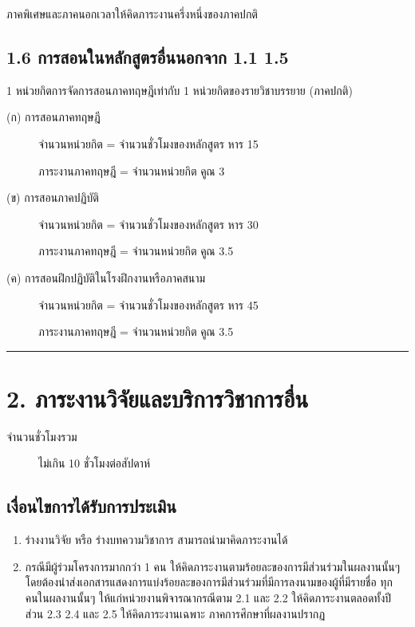 \documentclass[a4paper,12pt,english]{sphinxmanual}
\begin{document}
ภาคพิเศษและภาคนอกเวลาให้คิดภาระงานครึ่งหนึ่งของภาคปกติ


\subsection{1.6 การสอนในหลักสูตรอื่นนอกจาก 1.1 \sphinxhyphen{} 1.5}
\label{\detokenize{workload_rubric:id21}}
1 หน่วยกิตการจัดการสอนภาคทฤษฎีเท่ากับ 1 หน่วยกิตของรายวิชาบรรยาย (ภาคปกติ)
\begin{description}
\item[{(ก) การสอนภาคทฤษฎี}] \leavevmode
จำนวนหน่วยกิต = จำนวนชั่วโมงของหลักสูตร หาร 15

ภาระงานภาคทฤษฎี = จำนวนหน่วยกิต คูณ 3

\item[{(ข) การสอนภาคปฏิบัติ}] \leavevmode
จำนวนหน่วยกิต = จำนวนชั่วโมงของหลักสูตร หาร 30

ภาระงานภาคทฤษฎี = จำนวนหน่วยกิต คูณ 3.5

\item[{(ค) การสอนฝึกปฏิบัติในโรงฝึกงานหรือภาคสนาม}] \leavevmode
จำนวนหน่วยกิต = จำนวนชั่วโมงของหลักสูตร หาร 45

ภาระงานภาคทฤษฎี = จำนวนหน่วยกิต คูณ 3.5

\end{description}


\bigskip\hrule\bigskip



\section{2. ภาระงานวิจัยและบริการวิชาการอื่น}
\label{\detokenize{workload_rubric:id22}}\begin{description}
\item[{จำนวนชั่วโมงรวม}] \leavevmode
ไม่เกิน 10 ชั่วโมงต่อสัปดาห์

\end{description}


\subsection{เงื่อนไขการได้รับการประเมิน}
\label{\detokenize{workload_rubric:id23}}\begin{enumerate}
%
\item {} 
ร่างงานวิจัย หรือ ร่างบทความวิชาการ  สามารถนำมาคิดภาระงานได้

\item {} 
กรณีมีผู้ร่วมโครงการมากกว่า 1 คน ให้คิดภาระงานตามร้อยละของการมีส่วนร่วมในผลงานนั้นๆ โดยต้องนำส่งเอกสารแสดงการแบ่งร้อยละของการมีส่วนร่วมที่มีการลงนามของผู้ที่มีรายชื่อ ทุกคนในผลงานนั้นๆ ให้แก่หน่วยงานพิจารณากรณีตาม 2.1 และ 2.2 ให้คิดภาระงานตลอดทั้งปี ส่วน 2.3 2.4 และ 2.5 ให้คิดภาระงานเฉพาะ ภาคการศึกษาที่ผลงานปรากฏ

\end{enumerate}
\end{document}
